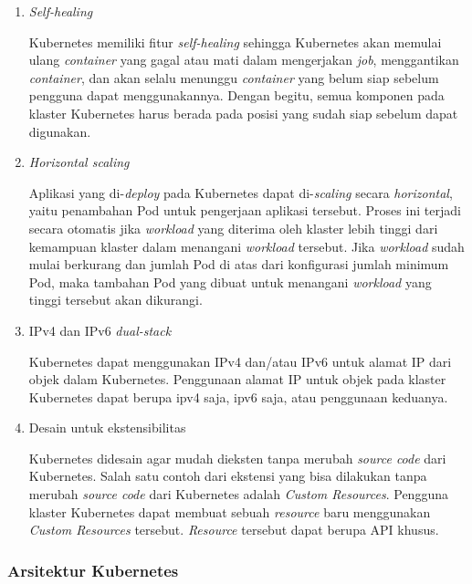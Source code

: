 \begin{enumerate}
  \item \emph{Self-healing}

    Kubernetes memiliki fitur \emph{self-healing} sehingga Kubernetes
    akan memulai ulang \emph{container} yang gagal atau mati dalam
    mengerjakan \emph{job}, menggantikan \emph{container}, dan akan selalu menunggu
    \emph{container} yang belum siap sebelum pengguna dapat menggunakannya. Dengan begitu,
    semua komponen pada klaster Kubernetes harus berada pada posisi yang sudah siap
    sebelum dapat digunakan.

    
  \item \emph{Horizontal scaling}

    Aplikasi yang di-\emph{deploy} pada Kubernetes dapat di-\emph{scaling} secara
    \emph{horizontal}, yaitu penambahan Pod untuk pengerjaan aplikasi tersebut. Proses
    ini terjadi secara otomatis jika \emph{workload} yang diterima oleh klaster lebih tinggi
    dari kemampuan klaster dalam menangani \emph{workload} tersebut. Jika \emph{workload}
    sudah mulai berkurang dan jumlah Pod di atas dari konfigurasi jumlah minimum Pod, maka
    tambahan Pod yang dibuat untuk menangani \emph{workload} yang tinggi tersebut akan dikurangi.
    
  \item IPv4 dan IPv6 \emph{dual-stack}

    Kubernetes dapat menggunakan IPv4 dan/atau IPv6 untuk alamat IP dari objek dalam Kubernetes.
    Penggunaan alamat IP untuk objek pada klaster Kubernetes dapat berupa ipv4 saja, ipv6 saja, atau
    penggunaan keduanya.
    
  \item Desain untuk ekstensibilitas

    Kubernetes didesain agar mudah dieksten tanpa merubah \emph{source code} dari Kubernetes.
    Salah satu contoh dari ekstensi yang bisa dilakukan tanpa merubah \emph{source code}
    dari Kubernetes adalah \emph{Custom Resources}. Pengguna klaster Kubernetes dapat
    membuat sebuah \emph{resource} baru menggunakan \emph{Custom Resources} tersebut. \emph{Resource}
    tersebut dapat berupa API khusus.

    \clearpage
    
\end{enumerate}

\subsubsection{Arsitektur Kubernetes}

